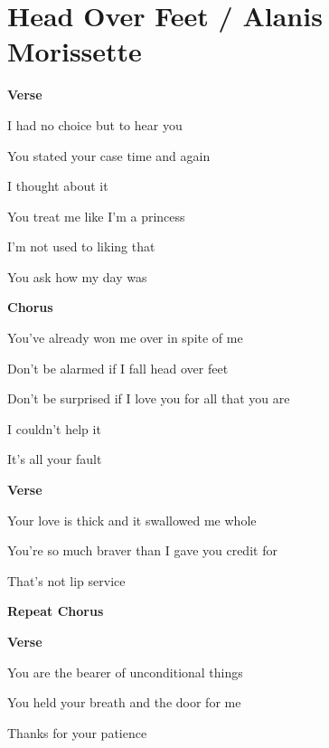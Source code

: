 \section{Head Over Feet / Alanis Morissette}\label{sec:headoverfeet}
  
\Cmajor
\Gmajor
\Aminor
\Fmajor
\DmajorEasy
\Bminor
\Amajor
 
\textbf{Verse}

I had no choice but to hear you

You stated your case time and again

I thought about it

You treat me like I'm a princess

I'm not used to  liking that

You ask how my day was 

\textbf{Chorus}

You've already won me over in spite of me

Don't be alarmed if I fall head over feet

Don't be surprised if I love you for all that you are

I couldn't help it

It's all your fault

\textbf{Verse}

Your love is thick and it swallowed me whole

You're so much braver than I gave you credit for

That's not lip service

\textbf{Repeat Chorus}

\textbf{Verse}

You are the bearer of unconditional things

You held your breath and the door for me

Thanks for your patience


